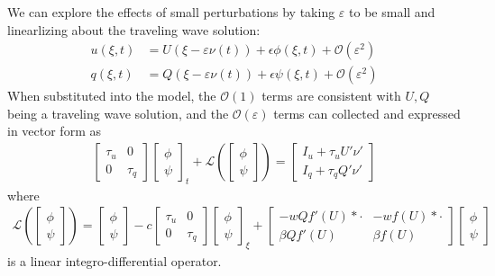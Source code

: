 \documentclass[landscape,final]{baposter}
\newcommand{\LL}{\mathcal{L}}
\newcommand{\OO}{\mathcal{O}}
\begin{document}
\begin{poster}
{
	We can explore the effects of small perturbations by taking $\varepsilon$ to be small and linearlizing about the traveling wave solution:
	\begin{align*}
		u(\xi, t) &= U(\xi - \varepsilon \nu(t)) + \epsilon \phi(\xi, t) + \OO(\varepsilon^2) \\
		q(\xi, t) &= Q(\xi - \varepsilon \nu(t)) + \epsilon \psi(\xi, t) + \OO(\varepsilon^2)
	\end{align*}
	When substituted into the model, the $\OO(1)$ terms are consistent with $U, Q$ being a traveling wave solution, and the $\OO(\varepsilon)$ terms can collected and expressed in vector form as
	\begin{align*}
	    \begin{bmatrix}\tau_u & 0 \\ 0 & \tau_q\end{bmatrix} \begin{bmatrix}\phi \\ \psi \end{bmatrix}_t + \LL \left(\begin{bmatrix} \phi \\ \psi \end{bmatrix} \right)
	        = 
	        \begin{bmatrix} I_u + \tau_u U' \nu' \\ I_q + \tau_q Q' \nu ' \end{bmatrix}
	\end{align*}
	where
	\begin{align*}
	\LL \left(\begin{bmatrix} \phi \\ \psi \end{bmatrix} \right) = \begin{bmatrix}\phi \\ \psi \end{bmatrix} - c\begin{bmatrix}\tau_u & 0 \\ 0 & \tau_q\end{bmatrix} \begin{bmatrix}\phi \\ \psi \end{bmatrix}_\xi +
	\begin{bmatrix}
	   -w Q f'(U) * \cdot  & -w f(U) * \cdot \\
	   \beta Q f'(U) & \beta f(U)
	\end{bmatrix}
	\begin{bmatrix}\phi \\ \psi \end{bmatrix}
	\end{align*}
	is a linear integro-differential operator.
	\bigbreak
	
}
\end{poster}
\end{document}
